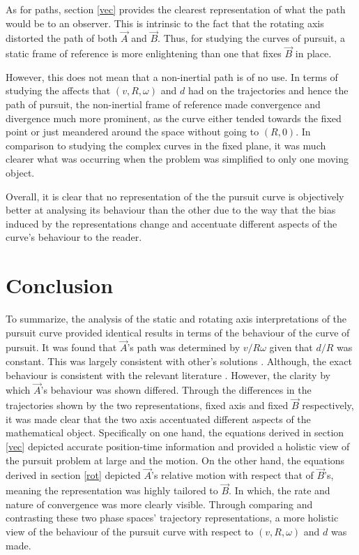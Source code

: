 \documentclass[pstricks, border=12pt]{article}
\begin{document}
As for paths, section \ref{vec} provides the clearest representation of what the path would be to an observer. This is intrinsic to the fact that the rotating axis distorted the path of both $\Vec{A}$ and $\Vec{B}$. Thus, for studying the curves of pursuit, a static frame of reference is more enlightening than one that fixes $\Vec{B}$ in place.

However, this does not mean that a non-inertial path is of no use. In terms of studying the affects that $(v, R, \omega)$ and $d$ had on the trajectories and hence the path of pursuit, the non-inertial frame of reference made convergence and divergence much more prominent, as the curve either tended towards the fixed point or just meandered around the space without going to $(R, 0)$. In comparison to studying the complex curves in the fixed plane, it was much clearer what was occurring when the problem was simplified to only one moving object.

Overall, it is clear that no representation of the the pursuit curve is objectively better at analysing its behaviour than the other due to the way that the bias induced by the representations change and accentuate different aspects of the curve's behaviour to the reader.


\section{Conclusion}
To summarize, the analysis of the static and rotating axis interpretations of the pursuit curve provided identical results in terms of the behaviour of the curve of pursuit. It was found that $\vec A$'s path was determined by $v/R\omega$ given that $d/R$ was constant. This was largely consistent with other's solutions \cite{ferreol_2017, mathematicsstackexchange_2017}. Although, the exact behaviour is consistent with the relevant literature \cite{ferreol_2017, 10.2307/2973034}. However, the clarity by which $\vec A$'s behaviour was shown differed. Through the differences in the trajectories shown by the two representations, fixed axis and fixed $\Vec{B}$ respectively, it was made clear that the two axis accentuated different aspects of the mathematical object. Specifically on one hand, the equations derived in section \ref{vec} depicted accurate position-time information and provided a holistic view of the pursuit problem at large and the motion. On the other hand, the equations derived in section \ref{rot} depicted $\Vec{A}$'s relative motion with respect that of $\Vec{B}$'s, meaning the representation was highly tailored to $\Vec{B}$. In which, the rate and nature of convergence was more clearly visible. Through comparing and contrasting these two phase spaces' trajectory representations, a more holistic view of the behaviour of the pursuit curve with respect to $(v, R, \omega)$ and $d$ was made.
\end{document}
